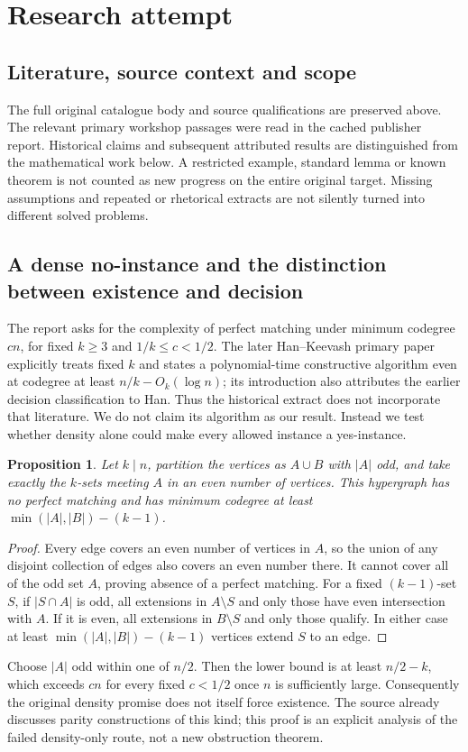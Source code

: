 \documentclass[11pt]{article}
\newtheorem{proposition}{Proposition}
\begin{document}
\section{Research attempt}
\subsection{Literature, source context and scope}
The full original catalogue body and source qualifications are preserved above. The relevant primary workshop passages were read in the cached publisher report. Historical claims and subsequent attributed results are distinguished from the mathematical work below. A restricted example, standard lemma or known theorem is not counted as new progress on the entire original target. Missing assumptions and repeated or rhetorical extracts are not silently turned into different solved problems.

\subsection{A dense no-instance and the distinction between existence and decision}
The report asks for the complexity of perfect matching under minimum codegree $cn$, for fixed $k\ge3$ and $1/k\le c<1/2$. The later Han--Keevash primary paper explicitly treats fixed $k$ and states a polynomial-time constructive algorithm even at codegree at least $n/k-O_k(\log n)$; its introduction also attributes the earlier decision classification to Han. Thus the historical extract does not incorporate that literature. We do not claim its algorithm as our result. Instead we test whether density alone could make every allowed instance a yes-instance.
\begin{proposition}
Let $k\mid n$, partition the vertices as $A\cup B$ with $|A|$ odd, and take exactly the $k$-sets meeting $A$ in an even number of vertices. This hypergraph has no perfect matching and has minimum codegree at least $\min(|A|,|B|)-(k-1)$.
\end{proposition}
\begin{proof}
Every edge covers an even number of vertices in $A$, so the union of any disjoint collection of edges also covers an even number there. It cannot cover all of the odd set $A$, proving absence of a perfect matching. For a fixed $(k-1)$-set $S$, if $|S\cap A|$ is odd, all extensions in $A\setminus S$ and only those have even intersection with $A$. If it is even, all extensions in $B\setminus S$ and only those qualify. In either case at least $\min(|A|,|B|)-(k-1)$ vertices extend $S$ to an edge.
\end{proof}
Choose $|A|$ odd within one of $n/2$. Then the lower bound is at least $n/2-k$, which exceeds $cn$ for every fixed $c<1/2$ once $n$ is sufficiently large. Consequently the original density promise does not itself force existence. The source already discusses parity constructions of this kind; this proof is an explicit analysis of the failed density-only route, not a new obstruction theorem.
\end{document}
